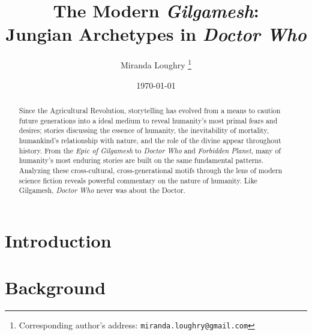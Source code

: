 \documentclass[10pt,a4paper]{article}
\begin{document}
\title{The Modern \emph{Gilgamesh}: \\
Jungian Archetypes in \emph{Doctor Who}}

\author{Miranda Loughry%
\thanks{Corresponding author's address: \texttt{miranda.loughry@gmail.com}}}

\date{\today}

\maketitle

\begin{abstract}
Since the Agricultural Revolution, storytelling has evolved from a means to caution future generations into a ideal medium to reveal humanity's most primal fears and desires; stories discussing the essence of humanity, the inevitability of mortality, humankind's relationship with nature, and the role of the divine appear throughout history. From the \emph{Epic of Gilgamesh} to \emph{Doctor Who} and \emph{Forbidden Planet}, many of humanity's most enduring stories are built on the same fundamental patterns. Analyzing these cross-cultural, cross-generational motifs through the lens of modern science fiction reveals powerful commentary on the nature of humanity. Like Gilgamesh, \emph{Doctor Who} never was about the Doctor.
\end{abstract}

\section{Introduction}
%
%

\section{Background}
\end{document}

